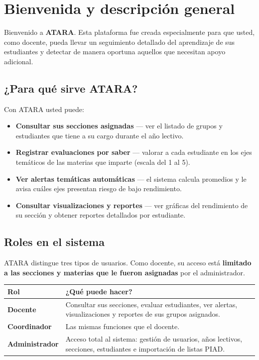 \documentclass[12pt,a4paper,oneside]{article}
\begin{document}
\section{Bienvenida y descripción general}

Bienvenido a \textbf{ATARA}. Esta plataforma fue creada especialmente para que usted,
como docente, pueda llevar un seguimiento detallado del aprendizaje de sus estudiantes
y detectar de manera oportuna aquellos que necesitan apoyo adicional.

\subsection{¿Para qué sirve ATARA?}

Con ATARA usted puede:

\begin{itemize}[leftmargin=1.5cm, itemsep=4pt]
  \item[\textbf{1.}] \textbf{Consultar sus secciones asignadas} — ver el listado de grupos
        y estudiantes que tiene a su cargo durante el año lectivo.
  \item[\textbf{2.}] \textbf{Registrar evaluaciones por saber} — valorar a cada estudiante
        en los ejes temáticos de las materias que imparte (escala del 1 al 5).
  \item[\textbf{3.}] \textbf{Ver alertas temáticas automáticas} — el sistema calcula
        promedios y le avisa cuáles ejes presentan riesgo de bajo rendimiento.
  \item[\textbf{4.}] \textbf{Consultar visualizaciones y reportes} — ver gráficas del
        rendimiento de su sección y obtener reportes detallados por estudiante.
\end{itemize}

\subsection{Roles en el sistema}

ATARA distingue tres tipos de usuarios. Como docente, su acceso está \textbf{limitado a las
secciones y materias que le fueron asignadas} por el administrador.

\begin{table}[H]
\centering\renewcommand{\arraystretch}{1.3}\small
\begin{tabularx}{\textwidth}{@{}p{3.2cm} X@{}}
\toprule
\textbf{Rol} & \textbf{¿Qué puede hacer?} \\
\midrule
\textbf{Docente}
  & Consultar sus secciones, evaluar estudiantes, ver alertas,
    visualizaciones y reportes de sus grupos asignados. \\
\textbf{Coordinador}
  & Las mismas funciones que el docente. \\
\textbf{Administrador}
  & Acceso total al sistema: gestión de usuarios, años lectivos,
    secciones, estudiantes e importación de listas PIAD. \\
\bottomrule
\end{tabularx}
\end{table}
\end{document}
